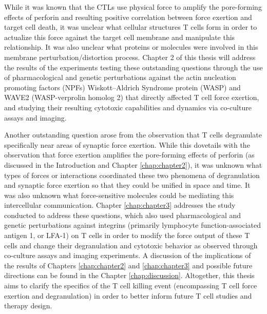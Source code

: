 While it was known that the CTLs use physical force to amplify the pore-forming effects of perforin and resulting positive correlation between force exertion and  target cell death, it was unclear what cellular structures T cells form in order to actualize this force against the target cell membrane and manipulate this relationship. It was also unclear what proteins or molecules were involved in this membrane perturbation/distortion process. Chapter 2 of this thesis will address the results of the experiments testing these outstanding questions through the use of pharmacological and genetic perturbations against the actin nucleation promoting factors (NPFs) Wiskott–Aldrich Syndrome protein (WASP) and WAVE2 (WASP-verprolin homolog 2) that directly affected T cell force exertion, and studying their resulting cytotoxic capabilities and dynamics via co-culture assays and imaging.

Another outstanding question arose from the observation that T cells degranulate specifically near areas of synaptic force exertion. While this dovetails with the observation that force exertion amplifies the pore-forming effects of perforin (as discussed in the Introduction and Chapter \ref{chap:chapter2}), it was unknown what types of forces or interactions coordinated these two phenomena of degranulation and synaptic force exertion so that they could be unified in space and time. It was also unknown what force-sensitive molecules could be mediating this intercellular communication. Chapter \ref{chap:chapter3} addresses the study conducted to address these questions, which also used pharmacological and genetic perturbations against integrins (primarily lymphocyte function-associated antigen 1, or LFA-1) on T cells in order to modify the force output of these T cells and change their degranulation and cytotoxic behavior as observed through co-culture assays and imaging experiments. A discussion of the implications of the results of Chapters \ref{chap:chapter2} and \ref{chap:chapter3} and possible future directions can be found in the Chapter \ref{chap:discussion}. Altogether, this thesis aims to clarify the specifics of the T cell killing event (encompassing T cell force exertion and degranulation) in order to better inform future T cell studies and therapy design. 
